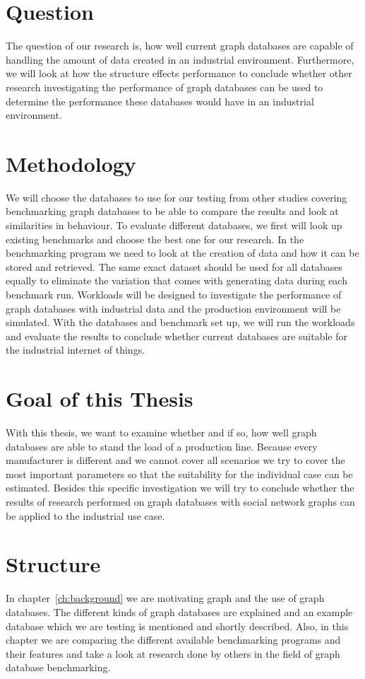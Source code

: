 \section{Question}
The question of our research is,
how well current graph databases are capable of handling the amount of data created in an industrial environment.
Furthermore,
we will look at how the structure effects performance to conclude whether other research investigating the performance of graph databases can be used to determine the performance these databases would have in an industrial environment.

\section{Methodology}
We will choose the databases to use for our testing from other studies covering benchmarking graph databases to be able to compare the results and look at similarities in behaviour.
To evaluate different databases,
we first will look up existing benchmarks and choose the best one for our research.
In the benchmarking program we need to look at the creation of data and how it can be stored and retrieved.
The same exact dataset should be used for all databases equally to eliminate the variation that comes with generating data during each benchmark run.
Workloads will be designed to investigate the performance of graph databases with industrial data and the production environment will be simulated.
With the databases and benchmark set up,
we will run the workloads and evaluate the results to conclude whether current databases are suitable for the industrial internet of things.

\section{Goal of this Thesis}
With this thesis,
we want to examine whether and if so,
how well graph databases are able to stand the load of a production line.
Because every manufacturer is different and we cannot cover all scenarios we try to cover the most important parameters
so that the suitability for the individual case can be estimated.
Besides this specific investigation we will try to conclude whether the results of research performed on graph databases with social network graphs can be applied to the industrial use case.

\section{Structure}
In chapter~\ref{ch:background} we are motivating graph and the use of graph databases.
The different kinds of graph databases are explained and an example database which we are testing is mentioned and shortly described.
Also,
in this chapter we are comparing the different available benchmarking programs and their features and take a look at research done by others in the field of graph database benchmarking.

